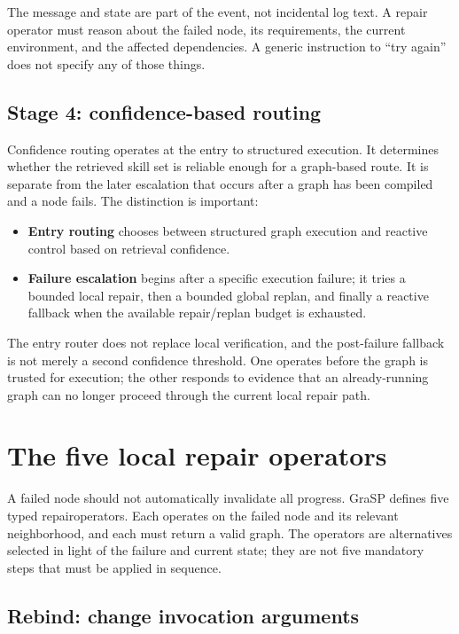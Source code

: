 The message and state are part of the event, not incidental log text. A repair operator must reason about the failed node, its requirements, the current environment, and the affected dependencies. A generic instruction to “try again” does not specify any of those things.

\subsection{Stage 4: confidence-based routing}

Confidence routing operates at the entry to structured execution. It determines whether the retrieved skill set is reliable enough for a graph-based route. It is separate from the later escalation that occurs after a graph has been compiled and a node fails. The distinction is important:

\begin{itemize}
  \item \textbf{Entry routing} chooses between structured graph execution and reactive control based on retrieval confidence.
  \item \textbf{Failure escalation} begins after a specific execution failure; it tries a bounded local repair, then a bounded global replan, and finally a reactive fallback when the available repair/replan budget is exhausted.
\end{itemize}

The entry router does not replace local verification, and the post-failure fallback is not merely a second confidence threshold. One operates before the graph is trusted for execution; the other responds to evidence that an already-running graph can no longer proceed through the current local repair path.\autocite{xia2026grasp}

\section{The five local repair operators}
\label{sec:ch17-five-repair-operators}

A failed node should not automatically invalidate all progress. GraSP defines five typed \glspl{repairoperator}. Each operates on the failed node and its relevant neighborhood, and each must return a valid graph. The operators are alternatives selected in light of the failure and current state; they are not five mandatory steps that must be applied in sequence.\autocite{xia2026grasp}

\subsection{Rebind: change invocation arguments}

